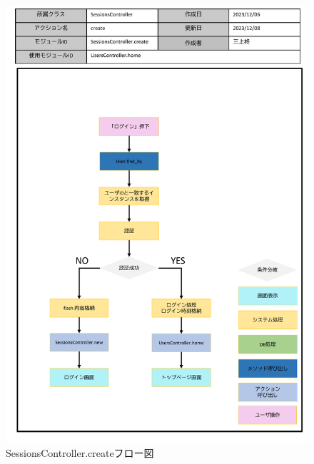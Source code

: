 \begin{figure}
    \centering
    \includegraphics[scale=0.7]{img/Sessions/pptx/SessionsController_create.pdf}
    \caption{SessionsController.createフロー図}
\end{figure}
